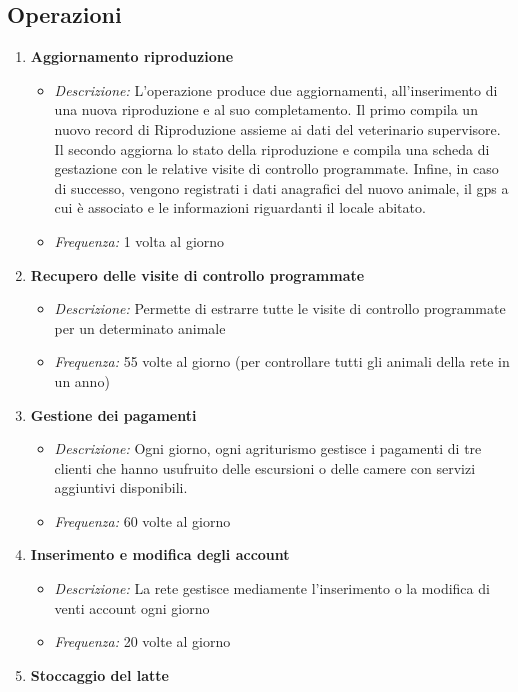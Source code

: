 \documentclass[12pt,a4paper]{article}
\begin{document}
\subsection{Operazioni}
\begin{enumerate}
\item \textbf{Aggiornamento riproduzione}
	\begin{itemize}
	\item \textit{Descrizione: }L'operazione produce due aggiornamenti, all'inserimento di una nuova riproduzione e al suo completamento. Il primo compila un nuovo record di Riproduzione assieme ai dati del veterinario supervisore. Il secondo aggiorna lo stato della riproduzione e compila una scheda di gestazione con le relative visite di controllo programmate. Infine, in caso di successo, vengono registrati i dati anagrafici del nuovo animale, il gps a cui è associato e le informazioni riguardanti il locale abitato.
	\item \textit{Frequenza: } 1 volta al giorno
	\end{itemize}
\item \textbf{Recupero delle visite di controllo programmate}
	\begin{itemize}
	\item \textit{Descrizione: }Permette di estrarre tutte le visite di controllo programmate per un determinato animale
	\item \textit{Frequenza: }55 volte al giorno (per controllare tutti gli animali della rete in un anno)
	\end{itemize}
\item \textbf{Gestione dei pagamenti}
	\begin{itemize}
	\item \textit{Descrizione: }Ogni giorno, ogni agriturismo gestisce i pagamenti di tre clienti che hanno usufruito delle escursioni o delle camere con servizi aggiuntivi disponibili.
	\item \textit{Frequenza: }60 volte al giorno
	\end{itemize}
\item \textbf{Inserimento e modifica degli account}
	\begin{itemize}
	\item \textit{Descrizione: }La rete gestisce mediamente l'inserimento o la modifica di venti account ogni giorno
	\item \textit{Frequenza: }20 volte al giorno
	\end{itemize}
\item \textbf{Stoccaggio del latte}

\end{enumerate}
\end{document}
